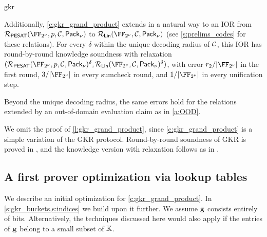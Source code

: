 \begin{lncsappendix}{gkr}
\begin{lemma}
Additionally, \cref{c:gkr_grand_product} extends in a natural way to an IOR from $\PESAT(\comfield,\gkrpol, \cC,\pack)$ to $\LIN(\comfield, \cC,\pack)$ (see \cref{s:prelims_codes} for these relations). For every $\delta$ within the unique decoding radius of $\mathcal{C}$, this IOR has round-by-round knowledge soundness with relaxation $(\PESAT(\comfield,\gkrpol,\cC,\pack)^\delta,\allowbreak\LIN(\comfield,\cC,\pack)^{\delta})$, with error $r_2/|\comfield|$ in the first round, $3/|\comfield|$ in every sumcheck round, and $1/|\comfield|$ in every unification step.

Beyond the unique decoding radius, the same errors hold for the relations extended by an out-of-domain evaluation claim as in \cref{a:OOD}.
\end{lemma}

We omit the  proof of \cref{l:gkr_grand_product}, since \cref{c:gkr_grand_product} is a simple variation of the GKR protocol. Round-by-round soundness of GKR is proved in \cite{CCHLRRW19}, and the knowledge version with relaxation follows as in \cite[proof of Lemma 6.6]{BCFW25}.

\subsection{A first prover optimization via lookup tables}\label{s:tables}%
We describe an initial optimization for  \cref{c:gkr_grand_product}. In \cref{s:gkr_buckets,s:indices} we build upon it further. We assume  $\mathbf{g}$ consists entirely of bits. Alternatively, the techniques discussed here would also apply if the entries of $\mathbf{g}$ belong to a small subset of $\mathbb{K}$.




\end{lncsappendix}
